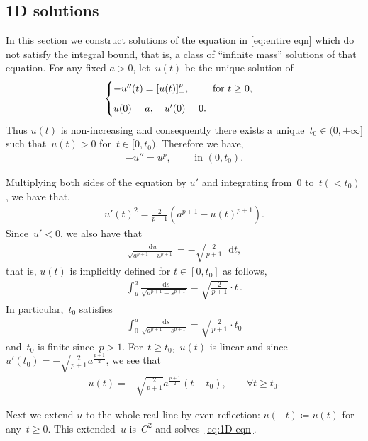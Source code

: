 \documentclass[10pt]{amsart}
\newcommand{\dd}{\mathop{}\!\mathrm{d}}
\begin{document}
\subsection{1D solutions}\label{subs:3.3}
In this section we construct solutions of the equation in \eqref{eq:entire eqn} which do not satisfy the integral
bound, that is, a class of ``infinite mass'' solutions of that equation. For any fixed $a>0$, let~$u(t)$ be the unique solution of
\begin{align}\label{eq:1D eqn}
    \begin{cases}
        -u''(t)= [u(t)]_+^p, \qquad \mbox{ for } t\geq 0, \vspace{2mm}\\
        u(0)=a, \quad u'(0)=0.
    \end{cases}
\end{align}
Thus $u(t)$ is non-increasing and consequently there exists a unique~$t_0\in(0,+\infty]$ such that~$u(t)>0$ for~$t\in [0,t_0)$. Therefore we have,
\begin{align*}
    -u''=u^p, \qquad \mbox{ in } (0,t_0).
\end{align*}

Multiplying both sides of the equation by $u'$ and integrating from~$0$ to~$t(<t_0)$, we have that,
\begin{align*}
    u'(t)^2 = \frac{2}{p+1}(a^{p+1}-u(t)^{p+1}).
\end{align*}
Since~$u'<0$, we also have that
\begin{align*}
    \frac{\dd u}{\sqrt{a^{p+1}- u^{p+1}}}= -\sqrt{\frac{2}{p+1}}\dd t,
\end{align*}
that is, $u(t)$ is implicitly defined for $t\in [0,t_0]$ as follows,
\begin{align*}
    \int_u^a \frac{\dd s}{\sqrt{a^{p+1}-s^{p+1}}} = \sqrt{\frac{2}{p+1}} \cdot t \, .
\end{align*}
In particular,~$t_0$ satisfies
\begin{align*}
    \int_0^a \frac{\dd s}{\sqrt{a^{p+1}-s^{p+1}}} = \sqrt{\frac{2}{p+1}} \cdot t_0
\end{align*}
and~$t_0$ is finite since~$p>1$.
For~$t\geq t_0$,~$u(t)$ is linear and since~$u'(t_0)=-\sqrt{\frac{2}{p+1}}a^{\frac{p+1}{2}}$, we see that
\begin{align*}
    u(t)= -\sqrt{\frac{2}{p+1}}a^{\frac{p+1}{2}}(t-t_0), \qquad \forall t\geq t_0.
\end{align*}

Next we extend $u$ to the whole real line by even reflection: $u(-t)\coloneqq u(t)$ for any~$t\geq 0$. This extended~$u$ is~$C^2$ and solves~\eqref{eq:1D eqn}.
\end{document}
